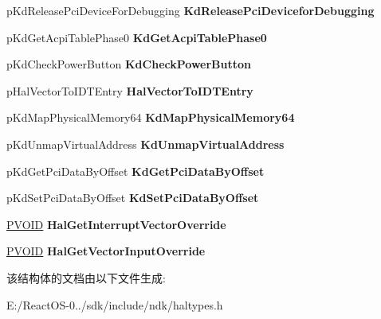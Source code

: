 \begin{DoxyCompactItemize}
p\+Kd\+Release\+Pci\+Device\+For\+Debugging {\bfseries Kd\+Release\+Pci\+Devicefor\+Debugging}
\item 
\mbox{\label{struct___h_a_l___p_r_i_v_a_t_e___d_i_s_p_a_t_c_h_a69a9d265f5ee7f7d787c7a96bd57fc29}} 
p\+Kd\+Get\+Acpi\+Table\+Phase0 {\bfseries Kd\+Get\+Acpi\+Table\+Phase0}
\item 
\mbox{\label{struct___h_a_l___p_r_i_v_a_t_e___d_i_s_p_a_t_c_h_a19bed751ea4e57563cac08719dd044e0}} 
p\+Kd\+Check\+Power\+Button {\bfseries Kd\+Check\+Power\+Button}
\item 
\mbox{\label{struct___h_a_l___p_r_i_v_a_t_e___d_i_s_p_a_t_c_h_ae2c74391a307fa47140734f685cf2b4c}} 
p\+Hal\+Vector\+To\+I\+D\+T\+Entry {\bfseries Hal\+Vector\+To\+I\+D\+T\+Entry}
\item 
\mbox{\label{struct___h_a_l___p_r_i_v_a_t_e___d_i_s_p_a_t_c_h_a3a5fc85598285544a0c8a24ec2de82f1}} 
p\+Kd\+Map\+Physical\+Memory64 {\bfseries Kd\+Map\+Physical\+Memory64}
\item 
\mbox{\label{struct___h_a_l___p_r_i_v_a_t_e___d_i_s_p_a_t_c_h_aea495c21acc3c3b0b45fb9c0cc38e51f}} 
p\+Kd\+Unmap\+Virtual\+Address {\bfseries Kd\+Unmap\+Virtual\+Address}
\item 
\mbox{\label{struct___h_a_l___p_r_i_v_a_t_e___d_i_s_p_a_t_c_h_a96666b858c8f4d3bb984facdf1430b52}} 
p\+Kd\+Get\+Pci\+Data\+By\+Offset {\bfseries Kd\+Get\+Pci\+Data\+By\+Offset}
\item 
\mbox{\label{struct___h_a_l___p_r_i_v_a_t_e___d_i_s_p_a_t_c_h_af6f1400b406c2eb74d0433829088cb82}} 
p\+Kd\+Set\+Pci\+Data\+By\+Offset {\bfseries Kd\+Set\+Pci\+Data\+By\+Offset}
\item 
\mbox{\label{struct___h_a_l___p_r_i_v_a_t_e___d_i_s_p_a_t_c_h_a169d5ecd88d87fdae1724ea8269fa9de}} 
\hyperlink{interfacevoid}{P\+V\+O\+ID} {\bfseries Hal\+Get\+Interrupt\+Vector\+Override}
\item 
\mbox{\label{struct___h_a_l___p_r_i_v_a_t_e___d_i_s_p_a_t_c_h_ad6a19fe4c7cb2c78abebad83cd52901a}} 
\hyperlink{interfacevoid}{P\+V\+O\+ID} {\bfseries Hal\+Get\+Vector\+Input\+Override}
\end{DoxyCompactItemize}


该结构体的文档由以下文件生成\+:\begin{DoxyCompactItemize}
\item 
E\+:/\+React\+O\+S-\/0../sdk/include/ndk/haltypes.\+h\end{DoxyCompactItemize}
